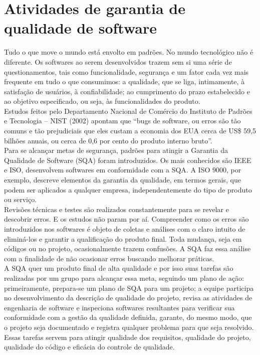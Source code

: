 \documentclass[12pt]{article}
\begin{document}
    \section{Atividades de garantia de qualidade de software}
        Tudo o que move o mundo está envolto em padrões. No mundo tecnológico não é diferente. Os softwares ao serem desenvolvidos trazem sem si uma série de questionamentos, tais como funcionalidade, segurança e um fator cada vez mais frequente em tudo o que consumimos: a qualidade, que se liga, intimamente, à satisfação de usuários, à confiabilidade; ao cumprimento do prazo estabelecido e ao objetivo especificado, ou seja, às funcionalidades do produto. \\
        Estudos feitos pelo Departamento Nacional de Comércio do Instituto de Padrões e Tecnologia – NIST (2002) apontam  que “bugs de software, ou erros são tão comuns e tão prejudiciais que eles custam a economia dos EUA cerca de US\$ 59,5 bilhões anuais, ou cerca de 0,6 por cento do produto interno bruto”. \\
        Para se alcançar metas de segurança, padrões para atingir a Garantia da Qualidade de Software (SQA) foram introduzidos. Os mais conhecidos são IEEE e ISO, desenvolvem softwares em conformidade com a SQA. A ISO 9000, por exemplo, descreve elementos da garantia da qualidade, em termos gerais, que podem ser aplicados a qualquer empresa, independentemente do tipo de produto ou serviço.\\
        Revisões técnicas e testes são realizados constantemente para se revelar e descobrir erros. E os estudos não param por aí. Compreender como os erros são introduzidos nos softwares é objeto de coletas e análises com o claro intuito de eliminá-los e garantir a qualificação do produto final. Toda mudança, seja em códigos ou no projeto, ocasionalmente trazem confusões. A SQA faz essa análise com a finalidade de não ocasionar erros buscando melhorar práticas.\\
        A SQA quer um produto final de alta qualidade e por isso suas tarefas são realizadas por um grupo para alcançar essa meta, seguindo um plano de ação: primeiramente, prepara-se um plano de SQA para um projeto; a equipe participa no desenvolvimento da descrição de qualidade do projeto, revisa as atividades de engenharia de software e inspeciona softwares resultantes para verificar sua conformidade com a gestão da qualidade definida, garante, do mesmo modo, que o projeto seja documentado e registra qualquer problema para que seja resolvido. Essas tarefas servem para atingir qualidade dos requisitos, qualidade do projeto, qualidade do código e eficácia do controle de qualidade. \\
\end{document}
